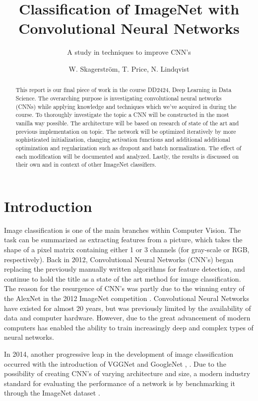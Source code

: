 \documentclass{kthreport}
\title{Classification of ImageNet with Convolutional Neural Networks}
\subtitle{A study in techniques to improve CNN's}
\author{W. Skagerström, T. Price, N. Lindqvist}
\begin{document}
\maketitle
\newpage
\begin{abstract}

\noindent
This report is our final piece of work in the course DD2424, Deep Learning in Data Science. The overarching purpose is investigating convolutional neural networks (CNNs) while applying knowledge and techniques which we've acquired in during the course.
\noindent
To thoroughly investigate the topic a CNN will be constructed in the most vanilla way possible. The architecture will be based on research of state of the art and previous implementation on topic. The network will be optimized iteratively by more sophisticated initialization, changing activation functions and additional additional optimization and regularization such as dropout and batch normalization. The effect of each modification will be documented and analyzed. Lastly, the results is discussed on their own and in context of other ImageNet classifiers.
\end{abstract}
\newpage

\tableofcontents
\newpage

\section{Introduction}
Image classification is one of the main branches within Computer Vision. The task can be summarized as extracting features from a picture, which takes the shape of a pixel matrix containing either 1 or 3 channels (for gray-scale or RGB, respectively). Back in 2012, Convolutional Neural Networks (CNN's) began replacing the previously manually written algorithms for feature detection, and continue to hold the title as a state of the art method for image classification. The reason for the resurgence of CNN's was partly due to the winning entry of the AlexNet in the 2012 ImageNet competition \cite{krizhevsky2012imagenet}. Convolutional Neural Networks have existed for almost 20 years, but was previously limited by the availability of data and computer hardware. However, due to the great advancement of modern computers has enabled the ability to train increasingly deep and complex types of neural networks.

In 2014, another progressive leap in the development of image classification occurred with the introduction of VGGNet and GoogleNet \cite{simonyan2014very}, \cite{szegedy2016rethinking}.  Due to the possibility of creating CNN's of varying architecture and size, a modern industry standard for evaluating the performance of a network is by benchmarking it through the ImageNet dataset \cite{russakovsky2015imagenet}.
\end{document}
